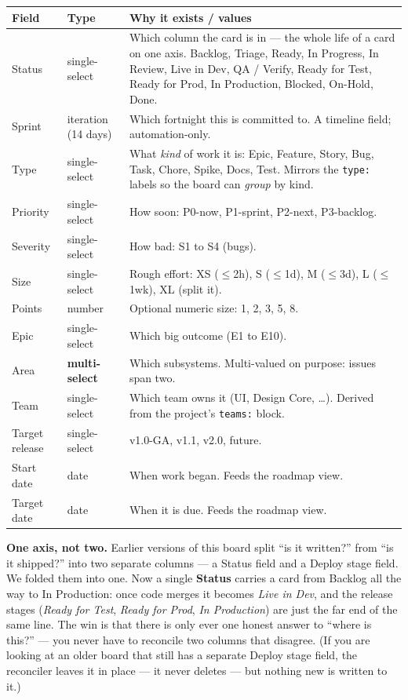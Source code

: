 \documentclass[11pt,a4paper]{report}
\newcommand{\code}[1]{\texttt{#1}}
\begin{document}
\begin{center}
\begin{longtable}{@{}p{2.8cm}p{2.6cm}p{7.4cm}@{}}
\toprule
\textbf{Field} & \textbf{Type} & \textbf{Why it exists / values} \\
\midrule
\endhead
Status & single-select & Which column the card is in --- the whole life of a card on one axis. Backlog, Triage, Ready, In Progress, In Review, Live in Dev, QA / Verify, Ready for Test, Ready for Prod, In Production, Blocked, On-Hold, Done. \\
Sprint & iteration (14 days) & Which fortnight this is committed to. A timeline field; automation-only. \\
Type & single-select & What \emph{kind} of work it is: Epic, Feature, Story, Bug, Task, Chore, Spike, Docs, Test. Mirrors the \code{type:} labels so the board can \emph{group} by kind. \\
Priority & single-select & How soon: P0-now, P1-sprint, P2-next, P3-backlog. \\
Severity & single-select & How bad: S1 to S4 (bugs). \\
Size & single-select & Rough effort: XS ($\le$2h), S ($\le$1d), M ($\le$3d), L ($\le$1wk), XL (split it). \\
Points & number & Optional numeric size: 1, 2, 3, 5, 8. \\
Epic & single-select & Which big outcome (E1 to E10). \\
Area & \textbf{multi-select} & Which subsystems. Multi-valued on purpose: issues span two. \\
Team & single-select & Which team owns it (UI, Design Core, \ldots). Derived from the project's \code{teams:} block. \\
Target release & single-select & v1.0-GA, v1.1, v2.0, future. \\
Start date & date & When work began. Feeds the roadmap view. \\
Target date & date & When it is due. Feeds the roadmap view. \\
\bottomrule
\end{longtable}
\end{center}

\begin{plainenglish}
\textbf{One axis, not two.} Earlier versions of this board split ``is it written?''
from ``is it shipped?'' into two separate columns --- a Status field and a Deploy
stage field. We folded them into one. Now a single \textbf{Status} carries a card
from Backlog all the way to In Production: once code merges it becomes \emph{Live in
Dev}, and the release stages (\emph{Ready for Test}, \emph{Ready for Prod}, \emph{In
Production}) are just the far end of the same line. The win is that there is only
ever one honest answer to ``where is this?'' --- you never have to reconcile two
columns that disagree. (If you are looking at an older board that still has a
separate Deploy stage field, the reconciler leaves it in place --- it never deletes
--- but nothing new is written to it.)
\end{plainenglish}
\end{document}
